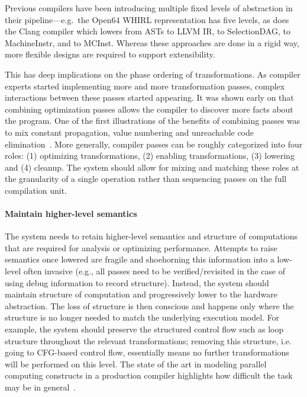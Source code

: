 Previous compilers have been introducing multiple fixed levels of abstraction in
their pipeline---e.g.\ the Open64 WHIRL representation \cite{open64} has five levels,
as does the Clang compiler which lowers from ASTs to LLVM IR,
to SelectionDAG, to MachineInstr, and to MCInst.  Whereas these approaches are
done in a rigid way, more flexible designs are required to support
extensibility.

This has deep implications on the
phase ordering of transformations. As compiler experts started implementing
more and more transformation passes, complex interactions between these passes
started appearing. It was shown early on that combining optimization passes
allows the compiler to discover more facts about the program. One of the first
illustrations of the benefits of combining passes was to mix constant
propagation, value numbering and unreachable code
elimination~\cite{Click1995}.
More generally, compiler passes can be roughly categorized into four roles:
(1) optimizing transformations, (2) enabling transformations, (3) lowering and
(4) cleanup. The system should allow for mixing and matching these roles at the
granularity of a single operation rather than sequencing passes on the full
compilation unit.

\paragraph{Maintain higher-level semantics}

The system needs to retain higher-level semantics and structure of computations
that are required for analysis or optimizing performance. Attempts to raise
semantics once lowered are fragile and shoehorning this information into a
low-level often invasive (e.g., all passes need to be verified/revisited in the
case of using debug information to record structure). Instead, the system should
maintain structure of computation and progressively lower to the hardware
abstraction. The loss of structure is then conscious and happens only where the
structure is no longer needed to match the underlying execution model.
For example, the system should preserve the structured control flow such as
loop structure throughout the relevant transformations; removing this
structure, i.e. going to CFG-based control flow, essentially means no further
transformations will be performed on this level.
The state of the art in modeling parallel computing constructs in a production compiler highlights how difficult the task may be in general~\cite{Khaldi:2015:LPI:2833157.2833158,Schardl:2017:TEF:3155284.3018758}.

